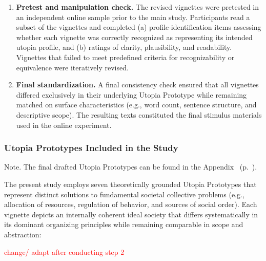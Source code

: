 \documentclass[jou,floatsintext]{apa7}
\begin{document}
\begin{enumerate}
    \item \textbf{Pretest and manipulation check.} The revised vignettes were pretested in an independent online sample prior to the main study. Participants read a subset of the vignettes and completed (a) profile-identification items assessing whether each vignette was correctly recognized as representing its intended utopia profile, and (b) ratings of clarity, plausibility, and readability. Vignettes that failed to meet predefined criteria for recognizability or equivalence were iteratively revised.

    \item \textbf{Final standardization.} A final consistency check ensured that all vignettes differed exclusively in their underlying Utopia Prototype while remaining matched on surface characteristics (e.g., word count, sentence structure, and descriptive scope). The resulting texts constituted the final stimulus materials used in the online experiment.
\end{enumerate}


\subsubsection{Utopia Prototypes Included in the Study}
\label{sec:up_study}

Note. The final drafted Utopia Prototypes can be found in the Appendix~ (p.~\pageref{appendix:finalUtopiaProto}). 

The present study employs seven theoretically grounded Utopia Prototypes that represent distinct solutions to fundamental societal collective problems (e.g., allocation of resources, regulation of behavior, and sources of social order). Each vignette depicts an internally coherent ideal society that differs systematically in its dominant organizing principles while remaining comparable in scope and abstraction:

\textcolor{red}{change/ adapt after conducting step 2}
\end{document}

